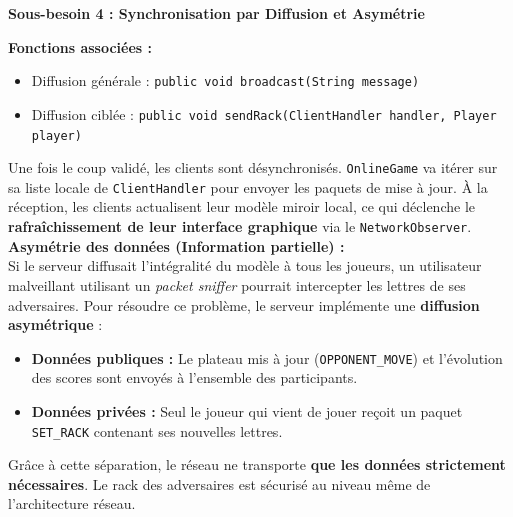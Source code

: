 \documentclass[a4paper]{article}
\begin{document}
\begin{besoinbox}
    \textbf{\large Sous-besoin 4 : Synchronisation par Diffusion et Asymétrie}
    
    \vspace{2mm}
    \textbf{Fonctions associées :}
    \begin{itemize}
        \item Diffusion générale : \texttt{public void broadcast(String message)}
        \item Diffusion ciblée : \texttt{public void sendRack(ClientHandler handler, Player player)}
    \end{itemize}
    \vspace{2mm}

    Une fois le coup validé, les clients sont désynchronisés. \texttt{OnlineGame} va itérer sur sa liste locale de \texttt{ClientHandler} pour envoyer les paquets de mise à jour. À la réception, les clients actualisent leur modèle miroir local, ce qui déclenche le \textbf{rafraîchissement de leur interface graphique} via le \texttt{NetworkObserver}.\\

    \textbf{Asymétrie des données (Information partielle) :} \\
    Si le serveur diffusait l'intégralité du modèle à tous les joueurs, un utilisateur malveillant utilisant un \textit{packet sniffer} pourrait intercepter les lettres de ses adversaires. Pour résoudre ce problème, le serveur implémente une \textbf{diffusion asymétrique} :
    \begin{itemize}
        \item \textbf{Données publiques :} Le plateau mis à jour (\texttt{OPPONENT\_MOVE}) et l'évolution des scores sont envoyés à l'ensemble des participants.
        \item \textbf{Données privées :} Seul le joueur qui vient de jouer reçoit un paquet \texttt{SET\_RACK} contenant ses nouvelles lettres.
    \end{itemize}
    Grâce à cette séparation, le réseau ne transporte \textbf{que les données strictement nécessaires}. Le rack des adversaires est sécurisé au niveau même de l'architecture réseau.
\end{besoinbox}
\end{document}

